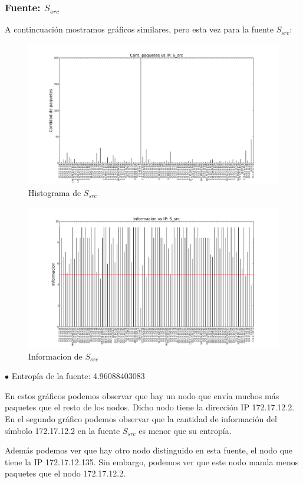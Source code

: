  
\subsubsection{Fuente: $S_{src}$}

A contincuación mostramos gráficos similares, pero esta vez para la fuente $S_{src}$:

\begin{figure}[H]\centering
    \includegraphics[width=0.8\linewidth]{../imgs/red-alto-palermo_S_src_hist.png}
    \caption{Histograma de $S_{src}$}\label{fig:Alto-src-hist}
\end{figure}

\begin{figure}[H]\centering
    \includegraphics[width=0.8\linewidth]{../imgs/red-alto-palermo_S_src_info.png}
    \caption{Informacion de $S_{src}$}\label{fig:Alto-src-info}
\end{figure}

$\bullet$ Entropía de la fuente: 4.96088403083

En estos gráficos podemos observar que hay un nodo que envía muchos más paquetes que el resto de los nodos. Dicho nodo tiene la dirección IP 172.17.12.2. En el segundo gráfico podemos observar que la cantidad de información del símbolo 172.17.12.2 en la fuente $S_{src}$ es menor que su entropía.

Además podemos ver que hay otro nodo distinguido en esta fuente, el nodo que tiene la IP 172.17.12.135. Sin embargo, podemos ver que este nodo manda menos paquetes que el nodo 172.17.12.2.
 
